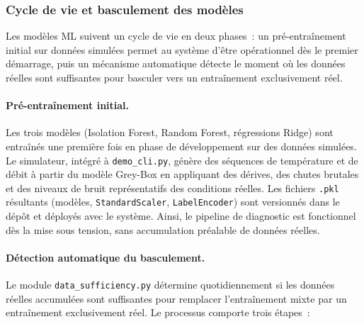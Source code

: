 \subsubsection{Cycle de vie et basculement des modèles}

Les modèles ML suivent un cycle de vie en deux phases~: un pré-entraînement initial sur données simulées permet au système d'être opérationnel dès le premier démarrage, puis un mécanisme automatique détecte le moment où les données réelles sont suffisantes pour basculer vers un entraînement exclusivement réel.

\paragraph{Pré-entraînement initial.}
Les trois modèles (Isolation Forest, Random Forest, régressions Ridge) sont entraînés une première fois en phase de développement sur des données simulées. Le simulateur, intégré à \texttt{demo\_cli.py}, génère des séquences de température et de débit à partir du modèle Grey-Box en appliquant des dérives, des chutes brutales et des niveaux de bruit représentatifs des conditions réelles. Les fichiers \texttt{.pkl} résultants (modèles, \texttt{StandardScaler}, \texttt{LabelEncoder}) sont versionnés dans le dépôt et déployés avec le système. Ainsi, le pipeline de diagnostic est fonctionnel dès la mise sous tension, sans accumulation préalable de données réelles.

\paragraph{Détection automatique du basculement.}
Le module \texttt{data\_sufficiency.py} détermine quotidiennement si les données réelles accumulées sont suffisantes pour remplacer l'entraînement mixte par un entraînement exclusivement réel. Le processus comporte trois étapes~:


